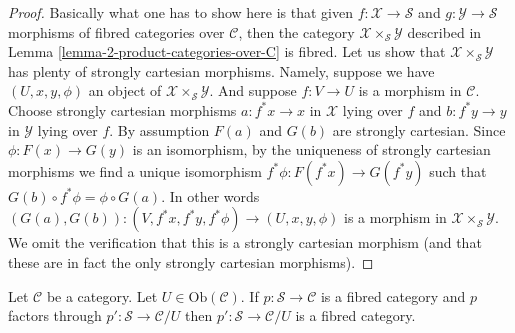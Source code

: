 \begin{proof}
Basically what one has to show here is that given
$f : \mathcal{X} \to \mathcal{S}$ and
$g : \mathcal{Y} \to \mathcal{S}$ morphisms of fibred
categories over $\mathcal{C}$, then the category
$\mathcal{X} \times_{\mathcal{S}} \mathcal{Y}$
described in Lemma \ref{lemma-2-product-categories-over-C} is fibred.
Let us show that $\mathcal{X} \times_{\mathcal{S}} \mathcal{Y}$
has plenty of strongly cartesian morphisms.
Namely, suppose we have $(U, x, y, \phi)$ an object of
$\mathcal{X} \times_{\mathcal{S}} \mathcal{Y}$.
And suppose $f : V \to U$ is a morphism in $\mathcal{C}$.
Choose strongly cartesian morphisms $a : f^*x \to x$ in $\mathcal{X}$
lying over $f$ and $b : f^*y \to y$ in $\mathcal{Y}$ lying over $f$.
By assumption $F(a)$ and $G(b)$ are strongly cartesian.
Since $\phi : F(x) \to G(y)$ is an isomorphism, by the uniqueness
of strongly cartesian morphisms we find a unique isomorphism
$f^*\phi : F(f^*x) \to G(f^*y)$ such that
$G(b) \circ f^*\phi = \phi \circ G(a)$. In other words
$(G(a), G(b)) : (V, f^*x, f^*y, f^*\phi) \to (U, x, y, \phi)$
is a morphism in $\mathcal{X} \times_{\mathcal{S}} \mathcal{Y}$.
We omit the verification that this is a strongly cartesian morphism
(and that these are in fact the only strongly cartesian morphisms).
\end{proof}

\begin{lemma}
\label{lemma-cute}
Let $\mathcal{C}$ be a category. Let $U \in \text{Ob}(\mathcal{C})$.
If $p : \mathcal{S} \to \mathcal{C}$ is a fibred category
and $p$ factors through $p' : \mathcal{S} \to \mathcal{C}/U$
then $p' : \mathcal{S} \to \mathcal{C}/U$ is a fibred category.
\end{lemma}

